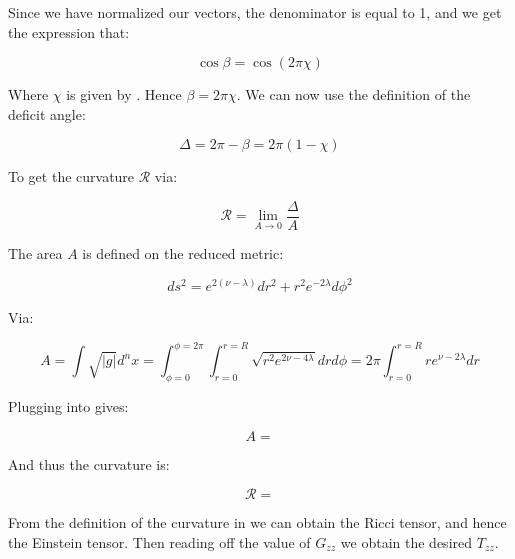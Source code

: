 \documentclass{article}
\begin{document}
Since we have normalized our vectors, the denominator is equal to 1, and we get the expression that:

\begin{equation}
\cos\beta=\cos(2\pi\chi)
\end{equation}

Where $\chi$ is given by . Hence $\beta=2\pi\chi$. We can now use the definition of the deficit angle:

\begin{equation}
\label{eq:deficit-angle}
\Delta=2\pi-\beta=2\pi(1-\chi)
\end{equation}

To get the curvature $\mathcal{R}$ via:

\begin{equation}
\label{eq:curvature}
\mathcal{R}=\lim_{A\rightarrow 0}\frac{\Delta}{A}
\end{equation}

The area $A$ is defined on the reduced metric:

\begin{equation}
ds^2=e^{2(\nu-\lambda)}dr^2+r^2 e^{-2\lambda}d\phi^2
\end{equation}

Via:

\begin{equation}
\label{eq:area}
A=\int\sqrt{|g|}d^n x=\int_{\phi=0}^{\phi=2\pi}\int_{r=0}^{r=R}\sqrt{r^2 e^{2\nu-4\lambda}}drd\phi=2\pi\int_{r=0}^{r=R}re^{\nu-2\lambda}dr
\end{equation}

Plugging  into  gives:

\begin{equation}
\label{eq:area-solved}
A=
\end{equation}

And thus the curvature is:

\begin{equation}
\label{eq:curvature-solved}
\mathcal{R}=
\end{equation}

From the definition of the curvature in  we can obtain the Ricci tensor, and hence the Einstein tensor. Then reading off the value of $G_{zz}$ we obtain the desired $T_{zz}$.



\end{document}
